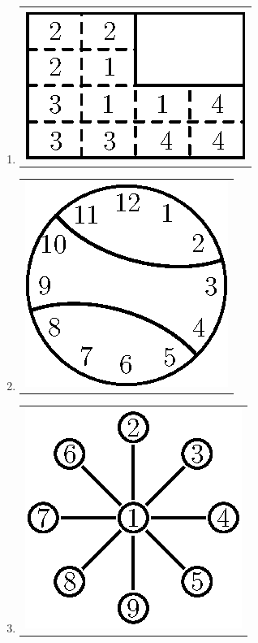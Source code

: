 \begin{enumerate}
\item 
\begin{tabular}[c]{c}
\centering
\includegraphics{src/figures/ans26.eps}
\end{tabular}

\item 
\begin{tabular}[c]{c}
\centering
\includegraphics{src/figures/ans27.eps}
\end{tabular}

\item 
\begin{tabular}[c]{c}
\centering
\includegraphics{src/figures/ans28.eps}
\end{tabular}


\end{enumerate}
